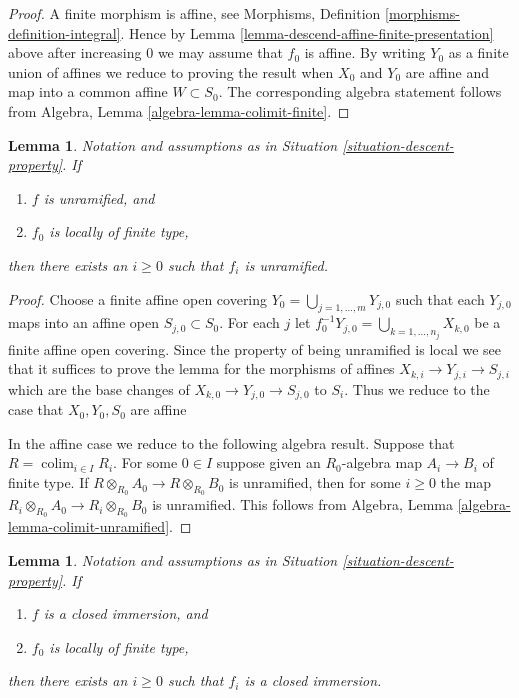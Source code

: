 \documentclass{stacks-project}
\theoremstyle{plain}
\newtheorem{lemma}[subsection]{Lemma}
\theoremstyle{definition}
\theoremstyle{remark}
\numberwithin{equation}{subsection}
\def\colim{\mathop{\mathrm{colim}}\nolimits}
\begin{document}
\begin{proof}
A finite morphism is affine, see
Morphisms, Definition \ref{morphisms-definition-integral}.
Hence by Lemma \ref{lemma-descend-affine-finite-presentation} above
after increasing $0$ we may assume that $f_0$ is affine.
By writing $Y_0$ as a finite union of affines we reduce to proving
the result when $X_0$ and $Y_0$ are affine and map
into a common affine $W \subset S_0$. The corresponding algebra
statement follows from Algebra, Lemma \ref{algebra-lemma-colimit-finite}.
\end{proof}

\begin{lemma}
\label{lemma-descend-unramified}
Notation and assumptions as in Situation \ref{situation-descent-property}.
If
\begin{enumerate}
\item $f$ is unramified, and
\item $f_0$ is locally of finite type,
\end{enumerate}
then there exists an $i \geq 0$ such that $f_i$ is unramified.
\end{lemma}

\begin{proof}
Choose a finite affine open covering
$Y_0 = \bigcup_{j = 1, \ldots, m} Y_{j, 0}$
such that each $Y_{j, 0}$ maps into an affine open
$S_{j, 0} \subset S_0$. For each $j$ let
$f_0^{-1}Y_{j, 0} = \bigcup_{k = 1, \ldots, n_j} X_{k, 0}$ be a
finite affine open covering. Since the property of being unramified is
local we see that it suffices to prove the lemma for the morphisms
of affines $X_{k, i} \to Y_{j, i} \to S_{j, i}$ which are the base
changes of $X_{k, 0} \to Y_{j, 0} \to S_{j, 0}$ to $S_i$.
Thus we reduce to the case that $X_0, Y_0, S_0$ are affine

\medskip\noindent
In the affine case we reduce to the following algebra result.
Suppose that $R = \colim_{i \in I} R_i$. For some $0 \in I$
suppose given an $R_0$-algebra map $A_i \to B_i$ of finite type.
If $R \otimes_{R_0} A_0 \to R \otimes_{R_0} B_0$ is unramified, then
for some $i \geq 0$ the map
$R_i \otimes_{R_0} A_0 \to R_i \otimes_{R_0} B_0$ is unramified.
This follows from Algebra,
Lemma \ref{algebra-lemma-colimit-unramified}.
\end{proof}

\begin{lemma}
\label{lemma-descend-closed-immersion-finite-presentation}
Notation and assumptions as in Situation \ref{situation-descent-property}.
If
\begin{enumerate}
\item $f$ is a closed immersion, and
\item $f_0$ is locally of finite type,
\end{enumerate}
then there exists an $i \geq 0$ such that $f_i$ is a closed immersion.
\end{lemma}
\end{document}
